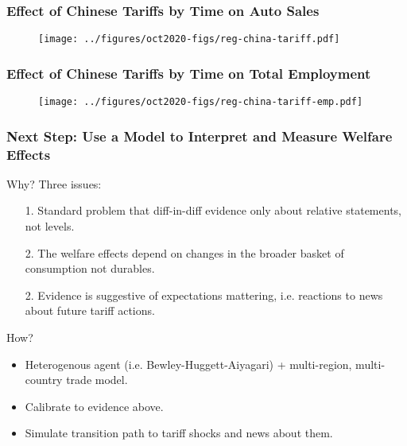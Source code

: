 \documentclass[9pt,pdftex,aspectratio=1610]{beamer}
\theoremstyle{definition}
\begin{document}
\begin{frame}[t]
\frametitle{Effect of Chinese Tariffs by Time on Auto Sales}
\begin{figure}[t]
\centerline{\texttt{[image: ../figures/oct2020-figs/reg-china-tariff.pdf]}}
\end{figure}
\end{frame}

\begin{frame}[t]
\frametitle{Effect of Chinese Tariffs by Time on Total Employment}
\begin{figure}[t]
\centerline{\texttt{[image: ../figures/oct2020-figs/reg-china-tariff-emp.pdf]}}
\end{figure}
\end{frame}


\begin{frame}[t]
\frametitle{Next Step: Use a Model to Interpret and Measure Welfare Effects}
Why? Three issues:
\begin{itemize}
\item[1.] Standard problem that diff-in-diff evidence only about relative statements, not levels.
\smallskip
\item[2.] The welfare effects depend on changes in the broader basket of consumption not durables.
\smallskip
\item[2.] Evidence is suggestive of expectations mattering, i.e. reactions to news about future tariff actions.
\end{itemize}
\bigskip
How?
\begin{itemize}
\item Heterogenous agent (i.e. Bewley-Huggett-Aiyagari) +  multi-region, multi-country trade model.
\smallskip
\item Calibrate to evidence above.
\smallskip
\item Simulate transition path to tariff shocks and news about them.
\end{itemize}
\end{frame}
\end{document}
